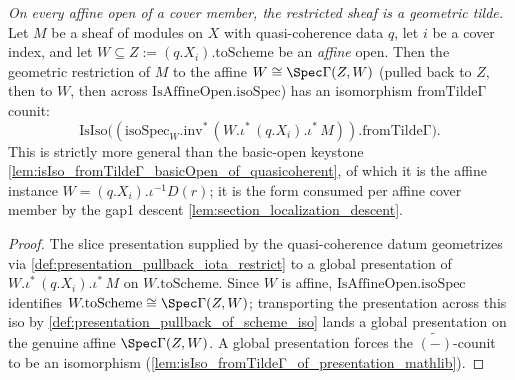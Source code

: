 \begin{lemma}

  \label{lem:isIso_fromTildeΓ_presentationPullback}
  \textit{On every affine open of a cover member, the restricted sheaf is a geometric tilde.}
  Let \(M\) be a sheaf of modules on \(X\) with quasi-coherence data \(q\), let \(i\) be a cover
  index, and let \(W \subseteq Z := (q.X_i).\mathrm{toScheme}\) be an \emph{affine} open. Then the
  geometric restriction of \(M\) to the affine \(W \cong \Spec \Gamma(Z, W)\) (pulled back to \(Z\),
  then to \(W\), then across \(\mathrm{IsAffineOpen.isoSpec}\)) has an isomorphism
  \(\mathrm{fromTildeΓ}\) counit:
  \[
    \mathrm{IsIso}\bigl((\mathrm{isoSpec}_W.\mathrm{inv}^{*}\,(W.\iota^{*}\,(q.X_i).\iota^{*}\,M))
      .\mathrm{fromTildeΓ}\bigr).
  \]
  This is strictly more general than the basic-open keystone
  \cref{lem:isIso_fromTildeΓ_basicOpen_of_quasicoherent}, of which it is the affine instance
  \(W = (q.X_i).\iota^{-1}D(r)\); it is the form consumed per affine cover member by the gap1 descent
  \cref{lem:section_localization_descent}.
\end{lemma}
\begin{proof}
  The slice presentation supplied by the quasi-coherence datum geometrizes via
  \cref{def:presentation_pullback_iota_restrict} to a global presentation of
  \(W.\iota^{*}\,(q.X_i).\iota^{*}\,M\) on \(W.\mathrm{toScheme}\). Since \(W\) is affine,
  \(\mathrm{IsAffineOpen.isoSpec}\) identifies \(W.\mathrm{toScheme} \cong \Spec \Gamma(Z, W)\);
  transporting the presentation across this iso by
  \cref{def:presentation_pullback_of_scheme_iso} lands a global presentation on the genuine affine
  \(\Spec \Gamma(Z, W)\). A global presentation forces the \(\widetilde{(-)}\)-counit to be an
  isomorphism (\cref{lem:isIso_fromTildeΓ_of_presentation_mathlib}).
\end{proof}


